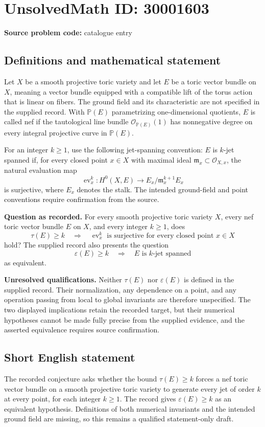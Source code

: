 \documentclass[11pt]{article}
\newcommand{\PP}{\mathbb{P}}
\begin{document}
\section*{UnsolvedMath ID: 30001603}
\textbf{Source problem code:} catalogue entry
\subsection{Definitions and mathematical statement}
Let \(X\) be a smooth projective toric variety and let \(E\) be a toric vector bundle on \(X\), meaning a vector bundle equipped with a compatible lift of the torus action that is linear on fibers. The ground field and its characteristic are not specified in the supplied record. With \(\PP(E)\) parametrizing one-dimensional quotients, \(E\) is called nef if the tautological line bundle \(\mathcal O_{\PP(E)}(1)\) has nonnegative degree on every integral projective curve in \(\PP(E)\).

For an integer \(k\geq 1\), use the following jet-spanning convention: \(E\) is \(k\)-jet spanned if, for every closed point \(x\in X\) with maximal ideal \(\mathfrak m_x\subset\mathcal O_{X,x}\), the natural evaluation map
\[
\operatorname{ev}_{x}^{k}\colon H^0(X,E)\longrightarrow E_x/\mathfrak m_x^{k+1}E_x
\]
is surjective, where \(E_x\) denotes the stalk. The intended ground-field and point conventions require confirmation from the source.

\textbf{Question as recorded.} For every smooth projective toric variety \(X\), every nef toric vector bundle \(E\) on \(X\), and every integer \(k\geq1\), does
\[
\tau(E)\geq k
\quad\Longrightarrow\quad
\operatorname{ev}_{x}^{k}\text{ is surjective for every closed point }x\in X
\]
hold? The supplied record also presents the question
\[
\varepsilon(E)\geq k
\quad\Longrightarrow\quad
E\text{ is }k\text{-jet spanned}
\]
as equivalent.

\textbf{Unresolved qualifications.} Neither \(\tau(E)\) nor \(\varepsilon(E)\) is defined in the supplied record. Their normalization, any dependence on a point, and any operation passing from local to global invariants are therefore unspecified. The two displayed implications retain the recorded target, but their numerical hypotheses cannot be made fully precise from the supplied evidence, and the asserted equivalence requires source confirmation.
\subsection{Short English statement}
The recorded conjecture asks whether the bound \(\tau(E)\geq k\) forces a nef toric vector bundle on a smooth projective toric variety to generate every jet of order \(k\) at every point, for each integer \(k\geq1\). The record gives \(\varepsilon(E)\geq k\) as an equivalent hypothesis. Definitions of both numerical invariants and the intended ground field are missing, so this remains a qualified statement-only draft.
\end{document}
